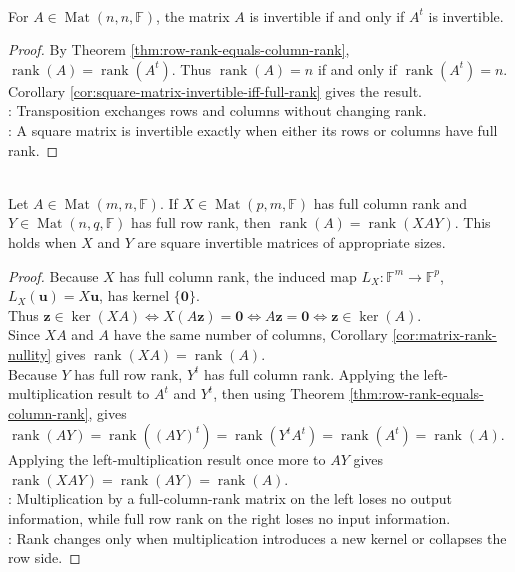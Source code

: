 \begin{corollary} \label{cor:transpose-invertible-iff} \\
For $A\in\operatorname{Mat}(n,n,\mathbb{F})$, the matrix $A$ is invertible if and only if $A^t$ is invertible.
\begin{proof}
By Theorem \ref{thm:row-rank-equals-column-rank}, $\operatorname{rank}(A)=\operatorname{rank}(A^t)$. Thus $\operatorname{rank}(A)=n$ if and only if $\operatorname{rank}(A^t)=n$.\\
Corollary \ref{cor:square-matrix-invertible-iff-full-rank} gives the result.\\
: Transposition exchanges rows and columns without changing rank.\\
: A square matrix is invertible exactly when either its rows or columns have full rank.
\end{proof}
\end{corollary}

\begin{theorem} \label{thm:full-rank-products-preserve-rank} \\
Let $A\in\operatorname{Mat}(m,n,\mathbb{F})$. If $X\in\operatorname{Mat}(p,m,\mathbb{F})$ has full column rank and $Y\in\operatorname{Mat}(n,q,\mathbb{F})$ has full row rank, then $\operatorname{rank}(A)=\operatorname{rank}(XAY)$. This holds when $X$ and $Y$ are square invertible matrices of appropriate sizes.
\begin{proof}
Because $X$ has full column rank, the induced map $L_X:\mathbb{F}^m\to\mathbb{F}^p$, $L_X(\mathbf{u})=X\mathbf{u}$, has kernel $\{\mathbf{0}\}$.\\
Thus $\mathbf{z}\in\ker(XA) \iff X(A\mathbf{z})=\mathbf{0} \iff A\mathbf{z}=\mathbf{0} \iff \mathbf{z}\in\ker(A)$.\\
Since $XA$ and $A$ have the same number of columns, Corollary \ref{cor:matrix-rank-nullity} gives $\operatorname{rank}(XA)=\operatorname{rank}(A)$.\\
Because $Y$ has full row rank, $Y^t$ has full column rank. Applying the left-multiplication result to $A^t$ and $Y^t$, then using Theorem \ref{thm:row-rank-equals-column-rank}, gives $\operatorname{rank}(AY)=\operatorname{rank}((AY)^t) =\operatorname{rank}(Y^tA^t) =\operatorname{rank}(A^t) =\operatorname{rank}(A)$.\\
Applying the left-multiplication result once more to $AY$ gives $\operatorname{rank}(XAY)=\operatorname{rank}(AY)=\operatorname{rank}(A)$.\\
: Multiplication by a full-column-rank matrix on the left loses no output information, while full row rank on the right loses no input information.\\
: Rank changes only when multiplication introduces a new kernel or collapses the row side.
\end{proof}
\end{theorem}

